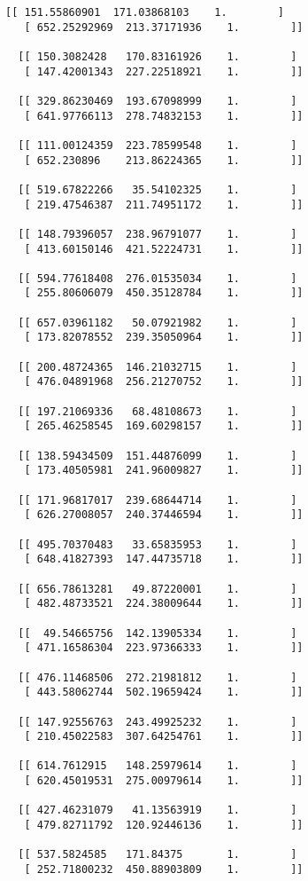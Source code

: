 \documentclass[11pt]{article}
\begin{document}
\begin{Verbatim}[commandchars=\\\{\}]
  [[ 151.55860901  171.03868103    1.        ]
   [ 652.25292969  213.37171936    1.        ]]

  [[ 150.3082428   170.83161926    1.        ]
   [ 147.42001343  227.22518921    1.        ]]

  [[ 329.86230469  193.67098999    1.        ]
   [ 641.97766113  278.74832153    1.        ]]

  [[ 111.00124359  223.78599548    1.        ]
   [ 652.230896    213.86224365    1.        ]]

  [[ 519.67822266   35.54102325    1.        ]
   [ 219.47546387  211.74951172    1.        ]]

  [[ 148.79396057  238.96791077    1.        ]
   [ 413.60150146  421.52224731    1.        ]]

  [[ 594.77618408  276.01535034    1.        ]
   [ 255.80606079  450.35128784    1.        ]]

  [[ 657.03961182   50.07921982    1.        ]
   [ 173.82078552  239.35050964    1.        ]]

  [[ 200.48724365  146.21032715    1.        ]
   [ 476.04891968  256.21270752    1.        ]]

  [[ 197.21069336   68.48108673    1.        ]
   [ 265.46258545  169.60298157    1.        ]]

  [[ 138.59434509  151.44876099    1.        ]
   [ 173.40505981  241.96009827    1.        ]]

  [[ 171.96817017  239.68644714    1.        ]
   [ 626.27008057  240.37446594    1.        ]]

  [[ 495.70370483   33.65835953    1.        ]
   [ 648.41827393  147.44735718    1.        ]]

  [[ 656.78613281   49.87220001    1.        ]
   [ 482.48733521  224.38009644    1.        ]]

  [[  49.54665756  142.13905334    1.        ]
   [ 471.16586304  223.97366333    1.        ]]

  [[ 476.11468506  272.21981812    1.        ]
   [ 443.58062744  502.19659424    1.        ]]

  [[ 147.92556763  243.49925232    1.        ]
   [ 210.45022583  307.64254761    1.        ]]

  [[ 614.7612915   148.25979614    1.        ]
   [ 620.45019531  275.00979614    1.        ]]

  [[ 427.46231079   41.13563919    1.        ]
   [ 479.82711792  120.92446136    1.        ]]

  [[ 537.5824585   171.84375       1.        ]
   [ 252.71800232  450.88903809    1.        ]]


\end{Verbatim}
\end{document}
